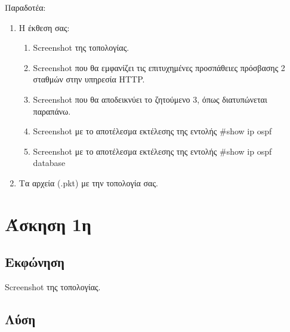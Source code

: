 \documentclass{assignment}
\begin{document}
Παραδοτέα:

\begin{enumerate}
  \item Η έκθεση σας:
  \begin{enumerate}
     \item Screenshot της τοπολογίας.
     \item Screenshot που θα εμφανίζει τις επιτυχημένες προσπάθειες πρόσβασης 2 σταθμών στην υπηρεσία HTTP.
     \item Screenshot που θα αποδεικνύει το ζητούμενο 3, όπως διατυπώνεται παραπάνω.
     \item Screenshot με το αποτέλεσμα εκτέλεσης της εντολής \#show ip ospf
     \item Screenshot με το αποτέλεσμα εκτέλεσης της εντολής \#show ip ospf database
  \end{enumerate}
  \item Τα αρχεία (.pkt) με την τοπολογία σας.
\end{enumerate}

\section{Άσκηση 1η}
\subsection*{Εκφώνηση}

Screenshot της τοπολογίας.

\subsection*{Λύση}
\end{document}
